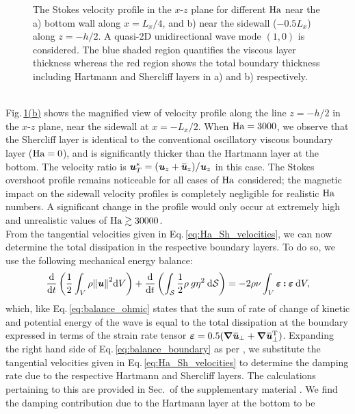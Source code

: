 \documentclass[aps,prfluids,reprint,superscriptaddress]{revtex4-2}
\newcommand{\h}[1]{\textbf{\textit{#1}}}
\newcommand{\ii}[1]{\text{#1}}
\newcommand{\overbar}[1]{\mkern 1.5mu\overline{\mkern-2mu#1\mkern-2mu}\mkern 1.5mu}
\newcommand{\RN}[1]{%
	\textup{\uppercase\expandafter{\romannumeral#1}}%
}
\newcommand{\subref}[2]{\ref{#1}\hyperref[#1]{(#2)}}
\begin{document}
\begin{figure}
	\caption{The Stokes velocity profile in the $x$-$z$ plane for different $\rm Ha$ near the a) bottom wall along $x=L_x/4$, and b) near the sidewall ($-0.5L_x$) along $z=-h/2$. A quasi-2D unidirectional wave mode $(1,0)$ is considered.  The blue shaded region quantifies the viscous layer thickness whereas the red region shows the total boundary thickness including Hartmann and Shercliff layers in a) and b) respectively.}
	\label{fig:stokes_vel}
\end{figure}
\\
\indent Fig.\,\subref{fig:stokes_vel}{b} shows the magnified view of velocity profile along the line $z=-h/2$ in the $x$-$z$ plane, near the sidewall at $x=-L_x/2$. When $\rm Ha = 3000$, we observe that the Shercliff layer is identical to the conventional oscillatory viscous boundary layer ($\rm Ha = 0$), and is significantly thicker than the Hartmann layer at the bottom. The velocity ratio is $\h u^*_{T}=({\h u}_{z} + {\overbar{\h u}}_{z})/{\h u}_{z}$ in this case. The Stokes overshoot profile remains noticeable for all cases of $\rm Ha$ considered; the magnetic impact on the sidewall velocity profiles is completely negligible for realistic $\rm Ha$ numbers. A significant change in the profile would only occur at extremely high and unrealistic values of $\rm Ha \gtrsim 30000$.
\\
\indent From the tangential velocities given in Eq.\,\eqref{eq:Ha_Sh_velocities}, we can now determine the total dissipation in the respective boundary layers. To do so, we use the following mechanical energy balance:
\begin{equation}
	\dv{}{t}\left( \frac{1}{2} 
	\int_{V} \rho \norm{\h u}^2 \mathrm dV  \right)
	+
	\dv{}{t}\left( \int_{\mathcal{S}} 
	\frac{1}{2} \rho \:g\eta^2  \: \mathrm d\mathcal{S}  
	\right)
	= -2\rho\nu
	\int_{V} \bm\varepsilon \bm{\mathbin{:}} \bm\varepsilon  \: \mathrm dV ,
	\label{eq:balance_boundary}
\end{equation}
which, like Eq.\,\eqref{eq:balance_ohmic} states that the sum of rate of change of kinetic and potential energy of the wave is equal to the total dissipation at the boundary expressed in terms of the strain rate tensor $\bm\varepsilon = 0.5(\bm\nabla\overbar{\h u}_{\perp} + \bm\nabla \overbar{\h u}_{\perp}^{\ii T})$. Expanding the right hand side of Eq.\,\eqref{eq:balance_boundary} as per \citet{Lamb1945}, we substitute the tangential velocities given in Eq.\,\eqref{eq:Ha_Sh_velocities} to determine the damping rate due to the respective Hartmann and Shercliff layers. The calculations pertaining to this are provided in Sec.\,\RN{3} of the supplementary material \cite{SMmagdamp_hegde}. We find the damping contribution due to the Hartmann layer at the bottom to be 
\end{document}
